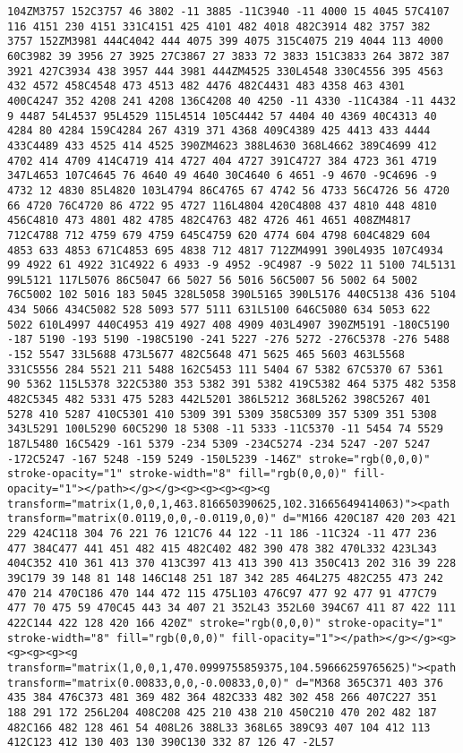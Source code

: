 \documentclass[
]{article}
\begin{document}
\begin{verbatim}
104ZM3757 152C3757 46 3802 -11 3885 -11C3940 -11 4000 15 4045 57C4107 116 4151 230 4151 331C4151 425 4101 482 4018 482C3914 482 3757 382 3757 152ZM3981 444C4042 444 4075 399 4075 315C4075 219 4044 113 4000 60C3982 39 3956 27 3925 27C3867 27 3833 72 3833 151C3833 264 3872 387 3921 427C3934 438 3957 444 3981 444ZM4525 330L4548 330C4556 395 4563 432 4572 458C4548 473 4513 482 4476 482C4431 483 4358 463 4301 400C4247 352 4208 241 4208 136C4208 40 4250 -11 4330 -11C4384 -11 4432 9 4487 54L4537 95L4529 115L4514 105C4442 57 4404 40 4369 40C4313 40 4284 80 4284 159C4284 267 4319 371 4368 409C4389 425 4413 433 4444 433C4489 433 4525 414 4525 390ZM4623 388L4630 368L4662 389C4699 412 4702 414 4709 414C4719 414 4727 404 4727 391C4727 384 4723 361 4719 347L4653 107C4645 76 4640 49 4640 30C4640 6 4651 -9 4670 -9C4696 -9 4732 12 4830 85L4820 103L4794 86C4765 67 4742 56 4733 56C4726 56 4720 66 4720 76C4720 86 4722 95 4727 116L4804 420C4808 437 4810 448 4810 456C4810 473 4801 482 4785 482C4763 482 4726 461 4651 408ZM4817 712C4788 712 4759 679 4759 645C4759 620 4774 604 4798 604C4829 604 4853 633 4853 671C4853 695 4838 712 4817 712ZM4991 390L4935 107C4934 99 4922 61 4922 31C4922 6 4933 -9 4952 -9C4987 -9 5022 11 5100 74L5131 99L5121 117L5076 86C5047 66 5027 56 5016 56C5007 56 5002 64 5002 76C5002 102 5016 183 5045 328L5058 390L5165 390L5176 440C5138 436 5104 434 5066 434C5082 528 5093 577 5111 631L5100 646C5080 634 5053 622 5022 610L4997 440C4953 419 4927 408 4909 403L4907 390ZM5191 -180C5190 -187 5190 -193 5190 -198C5190 -241 5227 -276 5272 -276C5378 -276 5488 -152 5547 33L5688 473L5677 482C5648 471 5625 465 5603 463L5568 331C5556 284 5521 211 5488 162C5453 111 5404 67 5382 67C5370 67 5361 90 5362 115L5378 322C5380 353 5382 391 5382 419C5382 464 5375 482 5358 482C5345 482 5331 475 5283 442L5201 386L5212 368L5262 398C5267 401 5278 410 5287 410C5301 410 5309 391 5309 358C5309 357 5309 351 5308 343L5291 100L5290 60C5290 18 5308 -11 5333 -11C5370 -11 5454 74 5529 187L5480 16C5429 -161 5379 -234 5309 -234C5274 -234 5247 -207 5247 -172C5247 -167 5248 -159 5249 -150L5239 -146Z" stroke="rgb(0,0,0)" stroke-opacity="1" stroke-width="8" fill="rgb(0,0,0)" fill-opacity="1"></path></g></g><g><g><g><g><g transform="matrix(1,0,0,1,463.816650390625,102.31665649414063)"><path transform="matrix(0.0119,0,0,-0.0119,0,0)" d="M166 420C187 420 203 421 229 424C118 304 76 221 76 121C76 44 122 -11 186 -11C324 -11 477 236 477 384C477 441 451 482 415 482C402 482 390 478 382 470L332 423L343 404C352 410 361 413 370 413C397 413 413 390 413 350C413 202 316 39 228 39C179 39 148 81 148 146C148 251 187 342 285 464L275 482C255 473 242 470 214 470C186 470 144 472 115 475L103 476C97 477 92 477 91 477C79 477 70 475 59 470C45 443 34 407 21 352L43 352L60 394C67 411 87 422 111 422C144 422 128 420 166 420Z" stroke="rgb(0,0,0)" stroke-opacity="1" stroke-width="8" fill="rgb(0,0,0)" fill-opacity="1"></path></g></g><g><g><g><g><g transform="matrix(1,0,0,1,470.0999755859375,104.59666259765625)"><path transform="matrix(0.00833,0,0,-0.00833,0,0)" d="M368 365C371 403 376 435 384 476C373 481 369 482 364 482C333 482 302 458 266 407C227 351 188 291 172 256L204 408C208 425 210 438 210 450C210 470 202 482 187 482C166 482 128 461 54 408L26 388L33 368L65 389C93 407 104 412 113 412C123 412 130 403 130 390C130 332 87 126 47 -2L57 
\end{verbatim}
\end{document}
